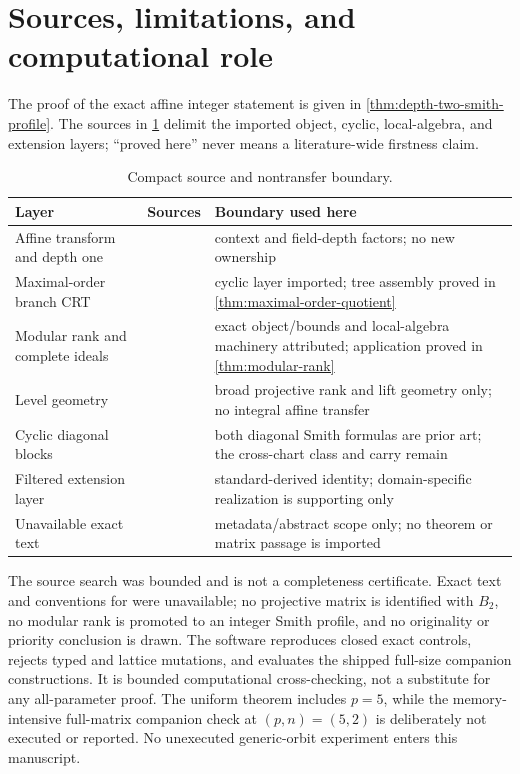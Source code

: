 \documentclass[12pt,a4paper]{article}
\theoremstyle{definition}
\begin{document}
\section{Sources, limitations, and computational role}\label{sec:S09}

The proof of the exact affine integer statement is given in
\cref{thm:depth-two-smith-profile}.  The sources in \cref{tab:source-boundary} delimit the imported
object, cyclic, local-algebra, and extension layers; ``proved here'' never
means a literature-wide firstness claim.

\begin{table}[t]
\centering
\small
\caption{Compact source and nontransfer boundary.}
\label{tab:source-boundary}
\begin{tabular}{@{}>{\raggedright\arraybackslash}p{}
                    >{\raggedright\arraybackslash}p{}
                    >{\raggedright\arraybackslash}p{}@{}}
\toprule
Layer & Sources & Boundary used here\\
\midrule
Affine transform and depth one & \cite{MOL12,ILM,CSX06} & context and
field-depth factors; no new ownership\\
Maximal-order branch CRT & \cite{MS15} & cyclic layer imported; tree
assembly proved in \cref{thm:maximal-order-quotient}\\
Modular rank and complete ideals & \cite{LT25,DVI26,LIP93,LW03} & exact
object/bounds and local-algebra machinery attributed; application proved in
\cref{thm:modular-rank}\\
Level geometry & \cite{LV14,KOH09,HVM89} & broad projective rank and lift
geometry only; no integral affine transfer\\
Cyclic diagonal blocks & \cite{WK04} & both diagonal Smith formulas are
prior art; the cross-chart class and carry remain\\
Filtered extension layer & \cite{SIN14,STK-TOR} & standard-derived identity;
domain-specific realization is supporting only\\
Unavailable exact text & \cite{LAN17,BLR23} & metadata/abstract scope only;
no theorem or matrix passage is imported\\
\bottomrule
\end{tabular}
\end{table}

The source search was bounded and is not a completeness certificate.  Exact
text and conventions for \cite{LAN17,BLR23} were unavailable; no projective
matrix is identified with $B_2$, no modular rank is promoted to an integer
Smith profile, and no originality or priority conclusion is drawn.  The
software reproduces closed exact controls, rejects typed and lattice
mutations, and evaluates the shipped full-size companion constructions.  It
is bounded computational cross-checking, not a substitute for any
all-parameter proof.  The uniform theorem includes $p=5$, while the
memory-intensive full-matrix companion check at $(p,n)=(5,2)$ is deliberately
not executed or reported.  No unexecuted generic-orbit experiment enters
this manuscript.
\end{document}
